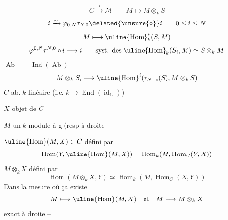 \[
C\xrightarrow{i}\mathcal M\qquad M\longmapsto M\otimes_k S
\]
\[
i\xrightarrow{\sim}\varphi_{0,N}\tau_{N,0}\deleted{\unsure{\circ}}i\qquad0\leq i\leq N
\]
\diagram{\begin{array}{ccc}
&(x_k)_{k\geq N}\mathrel{\substack{\longrightarrow\\[-.4em]\longrightarrow}}&\unsure{c_{\ell,k}}x_k-c_{\ell,k-i}x_{k+\ell}\\
M\lhook\joinrel\longrightarrow&M^{[N,+\infty[}&\mathrel{\substack{\longrightarrow\\[-.4em]\longrightarrow}}M^{[N,+\infty]\times\mathbb N}\\
x\longmapsto&(c_{i,k-i}x)_{k\geq N}&
\end{array}}
\[
M\longmapsto\uline{\operatorname{Hom}}_k^*(S,M)
\]
\[
\varphi^{0,N}\tau^{N,0}\circ i\longrightarrow i
\qquad\text{syst. des }\uline{\operatorname{Hom}}_k(S_i,M)\simeq S\otimes_k M
\]
\(\operatorname{Ab}\qquad\operatorname{Ind}(\operatorname{Ab})\)
\[
M\otimes_k S_i\longrightarrow\uline{\operatorname{Hom}}^i(\tau_{N-i}(S),M\otimes_k S)
\]
\(C\)  ab. \(k\)-linéaire (i.e. \(k\longrightarrow\operatorname{End}(\operatorname{id}_C)\))

\(X\) objet de \(C\)

\(M\) un \(k\)-module à g (resp à droite

\(\uline{\operatorname{Hom}}(M,X)\in C\) défini par
\[
\operatorname{Hom}(Y,\uline{\operatorname{Hom}}(M,X))=
\operatorname{Hom}_k(M,\operatorname{Hom}_C(Y,X))
\]
\(M\otimes_k X\) défini par
\[
\operatorname{Hom}(M\otimes_k X,Y)\simeq\operatorname{Hom}_k(M,\operatorname{Hom}_C(X,Y))
\]
Dans la mesure où ça existe
\[
M\longmapsto\uline{\operatorname{Hom}}(M,X)\quad\text{et}\quad M\longmapsto M\otimes_k X
\]
 exact à droite --
